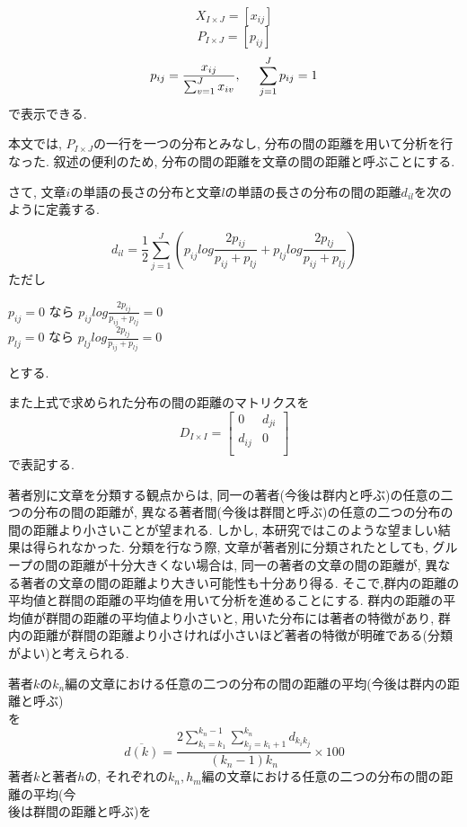 \[X_{I\times J}=\left[x_{ij} \right] \]   
\[ P_{I\times J}=\left[p_{ij} \right ] \]
\[ p_{ij}=\frac{x_{ij}}{\sum_{v=1}^{J}x_{iv}},\hspace{0.5cm}
     \sum_{j=1}^{J}p_{ij}=1 \]
で表示できる. 

本文では, $P_{I\times J}$の一行を一つの分布とみなし, 分布の間の距離を用いて分析を行なった. 叙述の便利のため, 分布の間の距離を文章の間の距離と呼ぶことにする. 

さて, 文章$i$の単語の長さの分布と文章$l$の単語の長さの分布の間の距離$d_{il}$を次のように定義する. 

\[ d_{il}=\frac{1}{2}\sum_{j=1}^{J}{(p_{ij}log\frac{2p_{ij}}{p_{ij}+p_{lj}}+p_{lj}log\frac{2p_{lj}}{p_{ij}+p_{lj}})} \]
\vspace*{-0.2mm}ただし\vspace*{-0.2mm}\begin{center} 
$p_{ij}=0$ \hspace{0.5cm} なら \hspace{0.5cm} $p_{ij}log{\frac{2p_{ij}}{p_{ij}+p_{lj}}}=0$\\
$p_{lj}=0$ \hspace{0.5cm} なら \hspace{0.5cm} $p_{lj}log{\frac{2p_{lj}}{p_{ij}+p_{lj}}}=0 $\\ 
\end{center}
\vspace*{-0.2mm}
とする. 

また上式で求められた分布の間の距離のマトリクスを
\[ D_{I\times I}=\left[ 
\begin{array}{cc}
0  &d_{ji} \\
d_{ij}& 0  \\
\end{array} \right] \]
で表記する. 

著者別に文章を分類する観点からは, 同一の著者(今後は群内と呼ぶ)の任意の二つの分布の間の距離が, 異なる著者間(今後は群間と呼ぶ)の任意の二つの分布の間の距離より小さいことが望まれる. しかし, 本研究ではこのような望ましい結果は得られなかった. 分類を行なう際, 文章が著者別に分類されたとしても, グループの間の距離が十分大きくない場合は, 同一の著者の文章の間の距離が, 異なる著者の文章の間の距離より大きい可能性も十分あり得る. そこで,群内の距離の平均値と群間の距離の平均値を用いて分析を進めることにする. 群内の距離の平均値が群間の距離の平均値より小さいと, 用いた分布には著者の特徴があり, 群内の距離が群間の距離より小さければ小さいほど著者の特徴が明確である(分類がよい)と考えられる.

著者\hspace{-0.1mm}$k$の\hspace{-0.1mm}$k_{n}$編の文章における任意の二つの分布の間の距離の平均(今後は群内の距離と呼ぶ)\\を
\[ \overline{d(k)}=\frac{2\sum_{k_{i}=k_1}^{k_{n}-1} \sum_{k_{j}=k_{i}+1}^{k_{n}}
d_{k_{i}k_{j}}}{(k_{n}-1)k_{n}} \times 100 \]
著者\hspace{-0.1mm}$k$と著者\hspace{-0.1mm}$h$の, それぞれの$k_{n}, h_{m}$編の文章における任意の二つの分布の間の距離の平均(今\\後は群間の距離と呼ぶ)を


